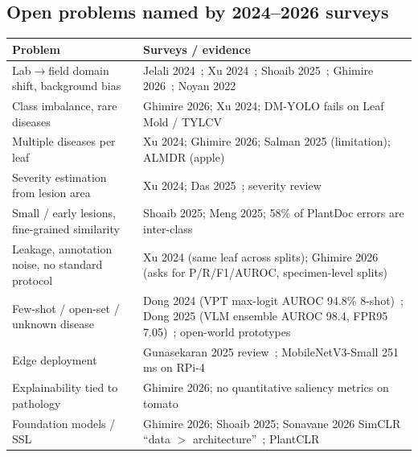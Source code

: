 \subsection{Open problems named by 2024--2026 surveys}
\begin{center}\small
\begin{tabular}{@{}L{6.2cm}L{9.3cm}@{}}
\toprule
Problem & Surveys / evidence \\
\midrule
Lab$\to$field domain shift, background bias & Jelali 2024~\cite{jelali2024}; Xu 2024~\cite{xu2024}; Shoaib 2025~\cite{shoaib2025}; Ghimire 2026~\cite{ghimire2026}; Noyan 2022~\cite{noyan2022} \\
Class imbalance, rare diseases & Ghimire 2026; Xu 2024; DM-YOLO fails on Leaf Mold / TYLCV~\cite{dmyolo} \\
Multiple diseases per leaf & Xu 2024; Ghimire 2026; Salman 2025 (limitation); ALMDR (apple)~\cite{almdr} \\
Severity estimation from lesion area & Xu 2024; Das 2025~\cite{das2025}; severity review~\cite{sevreview} \\
Small / early lesions, fine-grained similarity & Shoaib 2025; Meng 2025; 58\% of PlantDoc errors are inter-class~\cite{vmambaplantdoc} \\
Leakage, annotation noise, no standard protocol & Xu 2024 (same leaf across splits); Ghimire 2026 (asks for P/R/F1/AUROC, specimen-level splits) \\
Few-shot / open-set / unknown disease & Dong 2024 (VPT max-logit AUROC 94.8\% 8-shot)~\cite{dong2024}; Dong 2025 (VLM ensemble AUROC 98.4, FPR95 7.05)~\cite{dong2025}; open-world prototypes~\cite{eaai2025} \\
Edge deployment & Gunasekaran 2025 review~\cite{lightweightreview}; MobileNetV3-Small 251\,ms on RPi-4~\cite{mnv3edge} \\
Explainability tied to pathology & Ghimire 2026; no quantitative saliency metrics on tomato \\
Foundation models / SSL & Ghimire 2026; Shoaib 2025; Sonavane 2026 SimCLR ``data $>$ architecture''~\cite{sonavane2026}; PlantCLR~\cite{plantclr} \\
\bottomrule
\end{tabular}
\end{center}

